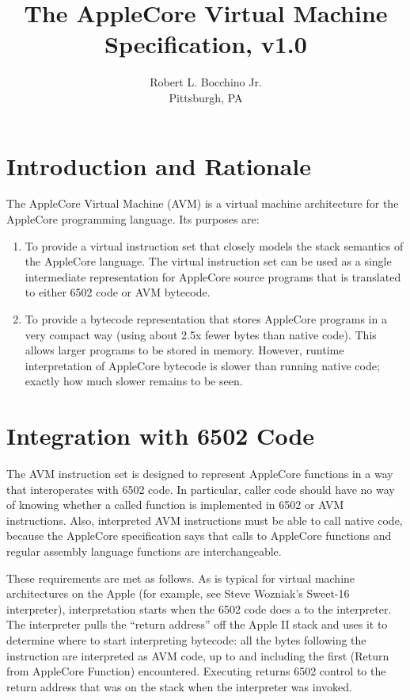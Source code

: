 \documentclass[10pt]{article}
\begin{document}
\title{\bfseries{The AppleCore Virtual Machine Specification, v1.0}}
%
\author{Robert L. Bocchino Jr.\\
Pittsburgh, PA}

\maketitle

\section{Introduction and Rationale}

The AppleCore Virtual Machine (AVM) is a virtual machine architecture
for the AppleCore programming language.  Its purposes are:
%
\begin{enumerate}
%
\item To provide a virtual instruction set that closely models the
  stack semantics of the AppleCore language.  The virtual instruction
  set can be used as a single intermediate representation for
  AppleCore source programs that is translated to either 6502 code or
  AVM bytecode.
%
\item To provide a bytecode representation that stores AppleCore
  programs in a very compact way (using about 2.5x fewer bytes than
  native code).  This allows larger programs to be stored in memory.
  However, runtime interpretation of AppleCore bytecode is slower
  than running native code; exactly how much slower remains to be
  seen.
%
\end{enumerate}

\section{Integration with 6502 Code}

The AVM instruction set is designed to represent AppleCore functions
in a way that interoperates with 6502 code.  In particular, caller
code should have no way of knowing whether a called function is
implemented in 6502 or AVM instructions.  Also, interpreted AVM
instructions must be able to call native code, because the AppleCore
specification says that calls to AppleCore functions and regular
assembly language functions are interchangeable.

These requirements are met as follows.  As is typical for virtual machine
architectures on the Apple (for example, see Steve Wozniak's Sweet-16
interpreter), interpretation starts when the 6502 code does a
 to the interpreter.  The interpreter pulls the ``return
address'' off the Apple II stack and uses it to determine where to start
interpreting bytecode: all the bytes following the 
instruction are interpreted as AVM code, up to and including the first
 (Return from AppleCore Function) encountered.
Executing  returns 6502 control to the return
address that was on the stack when the interpreter was
invoked.
\end{document}
